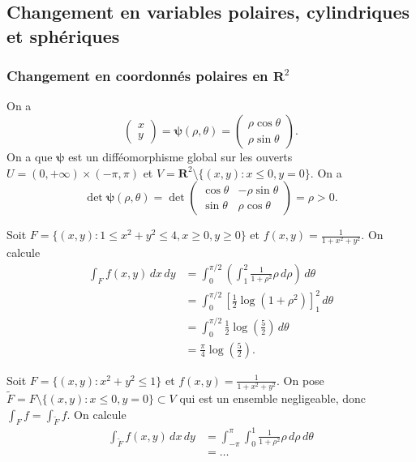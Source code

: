 \subsection{Changement en variables polaires, cylindriques et sphériques}

\subsubsection*{Changement en coordonnés polaires en $\mathbf{R}^{2}$}

On a 
$$
\begin{pmatrix}
x \\
y
\end{pmatrix}=\boldsymbol{\psi}(\rho,\theta)=\begin{pmatrix}
\rho \cos \theta \\
\rho \sin \theta
\end{pmatrix}.
$$
On a que $\boldsymbol{\psi}$ est un difféomorphisme global sur les ouverts $U=(0,+\infty)\times(-\pi,\pi)$ et $V=\mathbf{R}^{2}\setminus \{ (x,y):x\le 0, y=0 \}$. On a 
$$
\det \boldsymbol{\psi}(\rho,\theta)=\det \begin{pmatrix}
\cos \theta & -\rho \sin \theta \\
\sin \theta & \rho \cos \theta
\end{pmatrix}=\rho>0.
$$

\begin{example}
Soit $F=\{ (x,y):1\le x^{2}+y^{2}\le 4, x \ge 0 , y \ge 0 \}$ et $f(x,y)=\frac{1}{1+x^{2}+y^{2}}$. On calcule
\begin{align*}
\int _{F}f(x,y)\,dx\,dy & =\int _{0}^{\pi /2}\left( \int _{1}^{2}  \frac{1}{1+\rho^{2}}\rho\,d\rho \right)\,d\theta \\
 & =\int_{0}^{\pi/2} \left[ \frac{1}{2}\log(1+\rho^{2}) \right]_{1}^{2}  \, d\theta \\
 & =\int_{0}^{\pi /2} \frac{1}{2}\log\left( \frac{5}{2} \right) \, d\theta \\
  & =\frac{\pi}{4}\log\left( \frac{5}{2} \right).
\end{align*}
\end{example}
\begin{example}
Soit $F=\{ (x,y):x^{2}+y^{2}\le 1 \}$ et $f(x,y)=\frac{1}{1+x^{2}+y^{2}}$. On pose $\tilde{F}=F\setminus \{ (x,y):x\le 0, y=0\}\subset V$ qui est un ensemble negligeable, donc $\int _{F}f=\int _{\tilde{F}}f$. On calcule
\begin{align*}
\int _{\tilde{F}}f(x,y)\,dx\,dy & =\int_{-\pi}^{\pi} \int_{0}^{1} \frac{1}{1+\rho^{2}}\rho \, d\rho  \, d\theta \\
  & =\dots
\end{align*}
\end{example}